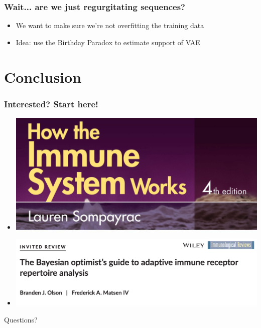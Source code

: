 \documentclass[mathserif,compress]{beamer}
\renewcommand\;{\,}
\begin{document}
\begin{frame}\frametitle{Wait... are we just regurgitating sequences?}
\begin{itemize}
\item
We want to make sure we're not overfitting the training data
\bigskip
\item
Idea: use the Birthday Paradox to estimate support of VAE
\end{itemize}
\end{frame}

\section{Conclusion}

\begin{frame}\frametitle{Interested? Start here!}
\begin{center}
\begin{itemize}
\item[]
\includegraphics[width=0.8 \linewidth]{Images/Sompayrac.png}
\bigskip
\item[]
\includegraphics[width=\linewidth]{Images/Optimist.png}
\end{itemize}
\end{center}
\end{frame}

\begin{frame}
\begin{center}
\large
Questions?
\end{center}
\end{frame}
\end{document}
